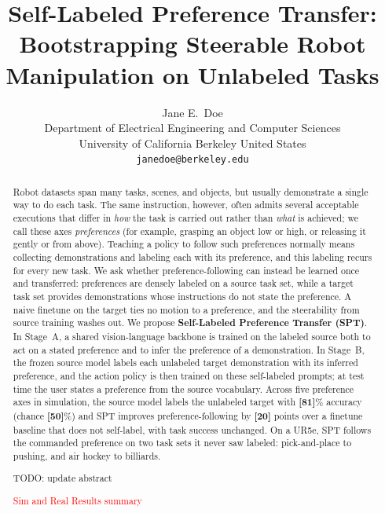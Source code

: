 \documentclass{article}
\title{Self-Labeled Preference Transfer: Bootstrapping Steerable Robot Manipulation on Unlabeled Tasks}
\author{
  Jane E.~Doe\\
  Department of Electrical Engineering and Computer Sciences\\
  University of California Berkeley
  United States\\
  \texttt{janedoe@berkeley.edu}
}
\newcommand{\YZ}[1]{{\color{blue}#1}}
\begin{document}
\maketitle


\begin{abstract}
Robot datasets span many tasks, scenes, and objects, but usually demonstrate a single way to do each task.
The same instruction, however, often admits several acceptable executions that differ in \emph{how} the task is carried out rather than \emph{what} is achieved; we call these axes \emph{preferences} (for example, grasping an object low or high, or releasing it gently or from above).
Teaching a policy to follow such preferences normally means collecting demonstrations and labeling each with its preference, and this labeling recurs for every new task.
We ask whether preference-following can instead be learned once and transferred: preferences are densely labeled on a source task set, while a target task set provides demonstrations whose instructions do not state the preference.
A naive finetune on the target ties no motion to a preference, and the steerability from source training washes out.
We propose \textbf{Self-Labeled Preference Transfer (SPT)}.
In Stage~A, a shared vision-language backbone is trained on the labeled source both to act on a stated preference and to infer the preference of a demonstration.
In Stage~B, the frozen source model labels each unlabeled target demonstration with its inferred preference, and the action policy is then trained on these self-labeled prompts; at test time the user states a preference from the source vocabulary.
Across five preference axes in simulation, the source model labels the unlabeled target with \textbf{[81]}\% accuracy (chance \textbf{[50]}\%) and SPT improves preference-following by \textbf{[20]} points over a finetune baseline that does not self-label, with task success unchanged.
On a UR5e, SPT follows the commanded preference on two task sets it never saw labeled: pick-and-place to pushing, and air hockey to billiards.

\YZ{TODO: update abstract}

\textcolor{red}{Sim and Real Results summary}

\end{abstract}
\end{document}
